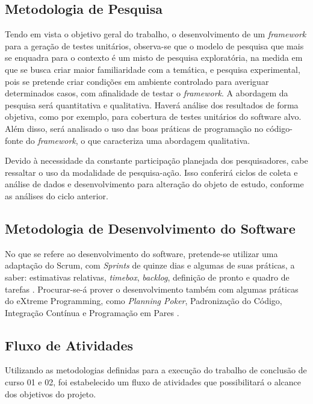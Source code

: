   \subsection{Metodologia de Pesquisa} \label{Metodologia de Pesquisa}
  Tendo em vista o objetivo geral do trabalho, o desenvolvimento de um \textit{framework} para a geração de testes unitários, observa-se que o modelo de pesquisa que mais se enquadra para o contexto é um misto de pesquisa exploratória, na medida em que se busca criar maior familiaridade com a temática, e pesquisa experimental, pois se pretende criar condições em ambiente controlado para averiguar determinados casos, com afinalidade de testar o \textit{framework}. A abordagem da pesquisa será quantitativa e qualitativa. Haverá análise dos resultados de forma objetiva, como por exemplo, para cobertura de testes unitários do software alvo. Além disso, será analisado o uso das boas práticas de programação no código-fonte do \textit{framework}, o que caracteriza uma abordagem qualitativa.
  \par
  \indent Devido à necessidade da constante participação planejada dos pesquisadores, cabe ressaltar o uso da modalidade de pesquisa-ação. Isso conferirá ciclos de coleta e análise de dados e desenvolvimento para alteração do objeto de estudo, conforme as análises do ciclo anterior.

 \subsection{Metodologia de Desenvolvimento do Software} \label{Metodologia de Desenvolvimento do Software}
  No que se refere ao desenvolvimento do software, pretende-se utilizar uma adaptação do Scrum, com \textit{Sprints} de quinze dias e algumas de suas práticas, a saber: estimativas relativas, \textit{timebox}, \textit{backlog}, definição de pronto e quadro de tarefas \cite{scrum2014}. Procurar-se-á prover o desenvolvimento também com algumas práticas do eXtreme Programming, como \textit{Planning Poker}, Padronização do Código, Integração Contínua e Programação em Pares \cite{wells2009}.
 
 \subsection{Fluxo de Atividades}
 	
 	Utilizando as metodologias definidas para a execução do trabalho de conclusão de curso 01 e 02, foi estabelecido um fluxo de atividades que possibilitará o alcance dos objetivos do projeto.
 	

